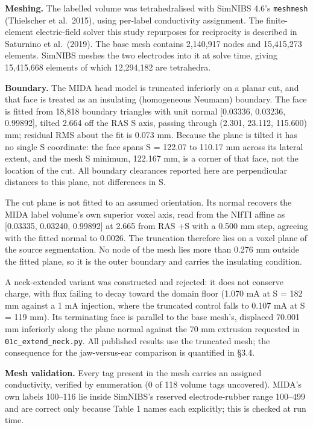 \documentclass[
  11pt,
  a4paper,
]{article}
\begin{document}
\textbf{Meshing.} The labelled volume was tetrahedralised with SimNIBS 4.6's
\texttt{meshmesh} (Thielscher et al.~2015), using per-label conductivity assignment. The
finite-element electric-field solver this study repurposes for reciprocity is
described in Saturnino et al.~(2019). The base mesh contains
2,140,917 nodes and 15,415,273 elements. SimNIBS meshes the two electrodes into
it at solve time, giving 15,415,668 elements of which 12,294,182 are tetrahedra.

\textbf{Boundary.} The MIDA head model is truncated inferiorly on a planar cut, and
that face is treated as an insulating (homogeneous Neumann) boundary. The face
is fitted from 18,818 boundary triangles with unit normal {[}\textminus{}0.03336, \textminus{}0.03236,
\textminus{}0.99892{]}, tilted 2.664\textdegree{} off the RAS S axis, passing through (\textminus{}2.301, 23.112,
\textminus{}115.600) mm; residual RMS about the fit is 0.073 mm. Because the plane is
tilted it has no single S coordinate: the face spans S = \textminus{}122.07 to \textminus{}110.17 mm
across its lateral extent, and the mesh S minimum, \textminus{}122.167 mm, is a corner of
that face, not the location of the cut. All boundary clearances reported here
are perpendicular distances to this plane, not differences in S.

The cut plane is not fitted to an assumed orientation. Its normal recovers the
MIDA label volume's own superior voxel axis, read from the NIfTI affine as
{[}0.03335, 0.03240, 0.99892{]} at 2.665\textdegree{} from RAS +S with a 0.500 mm step, agreeing
with the fitted normal to 0.0026\textdegree{}. The truncation therefore lies on a voxel plane
of the source segmentation. No node of the mesh lies more than 0.276 mm outside
the fitted plane, so it is the outer boundary and carries the insulating
condition.

A neck-extended variant was constructed and rejected: it does not conserve
charge, with flux failing to decay toward the domain floor (1.070 mA at S =
\textminus{}182 mm against a 1 mA injection, where the truncated control falls to 0.107 mA
at S = \textminus{}119 mm). Its terminating face is parallel to the base mesh's, displaced
70.001 mm inferiorly along the plane normal against the 70 mm extrusion
requested in \texttt{01c\_extend\_neck.py}. All published results use the truncated mesh;
the consequence for the jaw-versus-ear comparison is quantified in \S{}3.4.

\textbf{Mesh validation.} Every tag present in the mesh carries an assigned
conductivity, verified by enumeration (0 of 118 volume tags uncovered). MIDA's
own labels 100--116 lie inside SimNIBS's reserved electrode-rubber range 100--499
and are correct only because Table 1 names each explicitly; this is checked at
run time.
\end{document}
